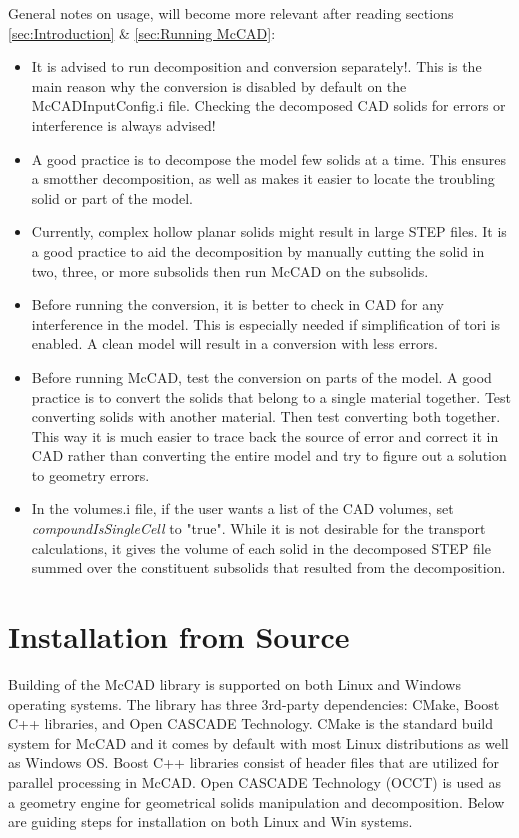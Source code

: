 \documentclass[letterpaper, 12 pt]{report}
\begin{document}
General notes on usage, will become more relevant after reading sections \ref{sec:Introduction} \& \ref{sec:Running McCAD}:
\begin{itemize}
	\item It is advised to run decomposition and conversion separately!. This is the main reason why the conversion is disabled by default on the McCADInputConfig.i file. Checking the decomposed CAD solids for errors or interference is always advised! 
	\item A good practice is to decompose the model few solids at a time. This ensures a smotther decomposition, as well as makes it easier to locate the troubling solid or part of the model.
	\item Currently, complex hollow planar solids might result in large STEP files. It is a good practice to aid the decomposition by manually cutting the solid in two, three, or more subsolids then run McCAD on the subsolids.
	\item Before running the conversion, it is better to check in CAD for any interference in the model. This is especially needed if simplification of tori is enabled. A clean model will result in a conversion with less errors.
	\item Before running McCAD, test the conversion on parts of the model. A good practice is to convert the solids that belong to a single material together. Test converting solids with another material. Then test converting both together. This way it is much easier to trace back the source of error and correct it in CAD rather than converting the entire model and try to figure out a solution to geometry errors.
	\item In the volumes.i file, if the user wants a list of the CAD volumes, set \emph{compoundIsSingleCell} to "true". While it is not desirable for the transport calculations, it gives the volume of each solid in the decomposed STEP file summed over the constituent subsolids that resulted from the decomposition.
\end{itemize}

\section{Installation from Source} \label{sec:Installation from Source}
Building of the McCAD library is supported on both Linux and Windows operating systems. The library has three 3rd-party dependencies: CMake, Boost C++ libraries, and Open CASCADE Technology. CMake is the standard build system for McCAD and it comes by default with most Linux distributions as well as Windows OS. Boost C++ libraries consist of header files that are utilized for parallel processing in McCAD. Open CASCADE Technology (OCCT) is used as a geometry engine for geometrical solids manipulation and decomposition. Below are guiding steps for installation on both Linux and Win systems. 
\end{document}
